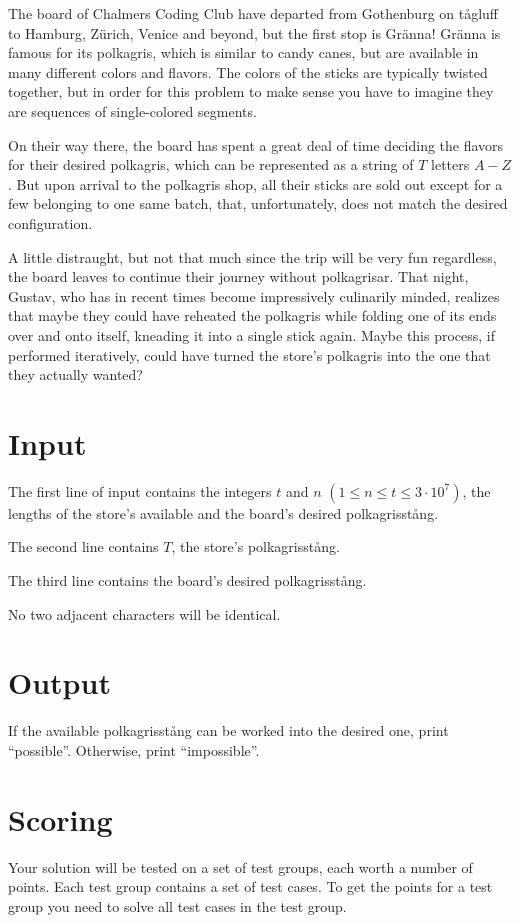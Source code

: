 \noindent

The board of Chalmers Coding Club have departed from Gothenburg on tågluff to Hamburg, Zürich, Venice and
beyond, but the first stop is Gränna! Gränna is famous for its polkagris, which is similar to candy
canes, but are available in many different colors and flavors. The colors of the sticks are typically
twisted together, but in order for this problem to make sense you have to imagine they are sequences
of single-colored segments.

On their way there, the board has spent a great deal of time deciding the flavors for their desired
polkagris, which can be represented as a string of $T$ letters $A-Z$. But upon arrival to the
polkagris shop, all their sticks are sold out except for a few belonging to one same batch, that,
unfortunately, does not match the desired configuration.

A little distraught, but not that much since the trip will be very fun regardless, the board leaves
to continue their journey without polkagrisar. That night, Gustav, who has in recent times become
impressively culinarily minded, realizes that maybe they could have reheated the polkagris while
folding one of its ends over and onto itself, kneading it into a single stick again. Maybe this
process, if performed iteratively, could have turned the store's polkagris into the one that they
actually wanted?

\section*{Input}

The first line of input contains the integers $t$ and $n$ $(1 \leq n \leq t \leq 3 \cdot 10^7)$,
the lengths of the store's available and the board's desired polkagrisstång. 

The second line contains $T$, the store's polkagrisstång.

The third line contains the board's desired polkagrisstång.

No two adjacent characters will be identical.

\section*{Output}
If the available polkagrisstång can be worked into the desired one, print ``possible''. Otherwise, print ``impossible''.

\section*{Scoring}
Your solution will be tested on a set of test groups, each worth a number of points. Each test group contains
a set of test cases. To get the points for a test group you need to solve all test cases in the test group.

